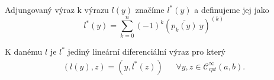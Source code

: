 \begin{definition}
Adjungovaný výraz k výrazu $l(y)$ značíme $l^*(y)$ a definujeme jej jako
\begin{equation}
    l^*(y) = \sum_{k=0}^{n} (-1)^{k} \left(\overline{p_k(y)} ~ y\right)^{(k)}
\end{equation}
\end{definition}

\begin{lemma}
K danému $l$ je $l^*$ jediný lineární diferenciální výraz pro který
\begin{align*}
    \left(l(y), z\right) = \left(y, l^*(z)\right)~ ~ ~ ~ ~ ~ ~ \forall y, z \in \mathcal{C}^{\infty}_{cpt} (a,b).
\end{align*}
\end{lemma}


